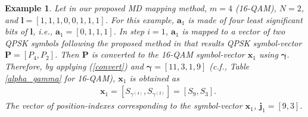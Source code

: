 \documentclass[12pt, draftclsnofoot, onecolumn]{IEEEtran}
\newcommand{\mb}[1]{\boldsymbol{#1}}
\newtheorem{example}{Example}
\begin{document}
\begin{example}
\label{first_step}
Let in our  proposed MD mapping method, $m = 4$ (16-QAM), $N = 2$, and $\mb{l} = [1,1,1,0,0,1,1,1]$.  For this example, $\mb{a}_{1}$   is made of four    least significant bits of ${\mb l}$, %
i.e., 
$\mb{a}_{1} = [0,1,1,1]$.
 In step $i=1$, $\mb{a}_{1}$ is mapped to a vector of two QPSK symbols following the proposed method in \cite{MD-BQPSK-Simoen} that results  QPSK symbol-vector  $\mb{P} = [P_{4},P_{2}]$. Then  $\mb{P}$ is converted to the 16-QAM symbol-vector $\mb{x}_{1}$  using  $\mb{\gamma}$.  Therefore, by applying (\ref{convert}) and $\mb{\gamma} = [11, 3, 1, 9]$ (c.f., Table \ref{alpha_gamma}   for 16-QAM),  $\mb{x}_{1}$  is obtained as
\begin{eqnarray}
& \mb{x}_{1} = [S_{{\gamma}^{(4)}}, S_{{\gamma}^{(2)}}] = [S_{9},S_{3}].
\end{eqnarray}  The vector of position-indexes corresponding to   the symbol-vector $\mb{x}_{1}$, $\mb{j}_{1}=[9,3]$. 
\end{example} 
 

\end{document}
